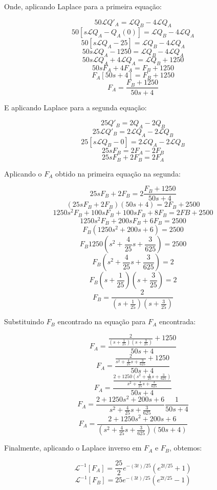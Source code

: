 \documentclass[12pt]{article}%
\newcommand{\newpara}
    {
    \vskip 0.5cm
    }
\begin{document}
    Onde, aplicando Laplace para a primeira equação:
    
    \[50\mathcal{L}{Q'_{A}} = \mathcal{L}{Q_{B}} - 4\mathcal{L}{Q_{A}}\]
    \[50[s\mathcal{L}{Q_{A}} - Q_{A}(0)] = \mathcal{L}{Q_{B}} - 4\mathcal{L}{Q_{A}}\]
    \[50[s\mathcal{L}{Q_{A}} - 25] = \mathcal{L}{Q_{B}} - 4\mathcal{L}{Q_{A}}\]
    \[50s\mathcal{L}{Q_{A}} - 1250 = \mathcal{L}{Q_{B}}- 4\mathcal{L}{Q_{A}}\]
    \[50s\mathcal{L}{Q_{A}} + 4\mathcal{L}{Q_{A}} = \mathcal{L}{Q_{B}} + 1250\]
    \[50sF_{A} + 4F_{A} = F_{B} + 1250\]
    \[F_{A}[50s + 4] = F_{B} + 1250\]
    \[F_{A} = \frac{F_{B} + 1250}{50s + 4}\]
    
    \newpara
    E aplicando Laplace para a segunda equação:
    
    \[25Q'_{B}  = 2Q_{A} - 2Q_{B}\]
    \[25\mathcal{L}{Q'_{B}} = 2\mathcal{L}{Q_{A}} - 2\mathcal{L}{Q_{B}}\]
    \[25[s\mathcal{L}{Q_{B}} - 0] = 2\mathcal{L}{Q_{A}} - 2\mathcal{L}{Q_{B}}\]
    \[25sF_{B} = 2F_{A} - 2F_{B}\]
    \[25sF_{B} + 2F_{B} = 2F_{A}\]
    
    \newpara
    Aplicando o \(F_{A}\) obtido na primeira equação na segunda:
    
    \[25sF_{B} + 2F_{B} = 2\frac{F_{B} + 1250}{50s + 4}\]
    \[(25sF_{B} + 2F_{B})(50s + 4) = 2F_{B} + 2500\]
    \[1250s^2F_{B} + 100sF_{B} + 100sF_{B} + 8F_{B} = 2F{B} + 2500\]
    \[1250s^2F_{B} + 200sF_{B} + 6F_{B} = 2500\]
    \[F_{B}(1250s^2 + 200s + 6) = 2500\]
    \[F_{B}1250(s^2 + \frac{4}{25}s + \frac{3}{625}) = 2500\]
    \[F_{B}(s^2 + \frac{4}{25}s + \frac{3}{625}) = 2\]
    \[F_{B}(s + \frac{1}{25})(s + \frac{3}{25}) = 2\]
    \[F_{B} = \frac{2}{(s + \frac{1}{25})(s + \frac{3}{25})}\]
    
    \newpara
    Substituindo \(F_{B}\) encontrado na equação para \(F_{A}\) encontrada:
    
    \[F_{A} = \frac{\frac{2}{(s + \frac{1}{25})(s + \frac{3}{25})} + 1250}{50s + 4}\]
    \[F_{A} = \frac{\frac{2}{s^2 + \frac{4}{25}s + \frac{3}{625}} + 1250}{50s + 4}\]
    \[F_{A} = \frac{\frac{2 + 1250(s^2 + \frac{4}{25}s + \frac{3}{625})}{s^2 + \frac{4}{25}s + \frac{3}{625}}}{50s + 4}\]
    \[F_{A} = \frac{2 + 1250s^2 + 200s + 6}{s^2 + \frac{4}{25}s + \frac{3}{625}} \frac{1}{50s + 4}\]
    \[F_{A} = \frac{2 + 1250s^2 + 200s + 6}{(s^2 + \frac{4}{25}s + \frac{3}{625})(50s + 4)}\]
    
    \newpara
    Finalmente, aplicando o Laplace inverso em \(F_{A}\) e \(F_{B}\), obtemos:
    
    \[\mathcal{L}^{-1}[F_{A}] = \frac{25}{2}e^{-(3t)/25}(e^{2t/25} + 1)\]
    \[\mathcal{L}^{-1}[F_{B}] = 25e^{-(3t)/25}(e^{2t/25} - 1)\]
\end{document}
